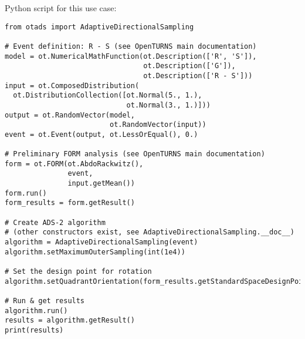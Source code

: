 Python script for this use case:

\begin{lstlisting}
from otads import AdaptiveDirectionalSampling

# Event definition: R - S (see OpenTURNS main documentation)
model = ot.NumericalMathFunction(ot.Description(['R', 'S']),
                                 ot.Description(['G']),
                                 ot.Description(['R - S']))
input = ot.ComposedDistribution(
  ot.DistributionCollection([ot.Normal(5., 1.),
                             ot.Normal(3., 1.)]))
output = ot.RandomVector(model,
                         ot.RandomVector(input))
event = ot.Event(output, ot.LessOrEqual(), 0.)

# Preliminary FORM analysis (see OpenTURNS main documentation)
form = ot.FORM(ot.AbdoRackwitz(),
               event,
               input.getMean())
form.run()
form_results = form.getResult()

# Create ADS-2 algorithm
# (other constructors exist, see AdaptiveDirectionalSampling.__doc__)
algorithm = AdaptiveDirectionalSampling(event)
algorithm.setMaximumOuterSampling(int(1e4))

# Set the design point for rotation
algorithm.setQuadrantOrientation(form_results.getStandardSpaceDesignPoint())

# Run & get results
algorithm.run()
results = algorithm.getResult()
print(results)
\end{lstlisting}
